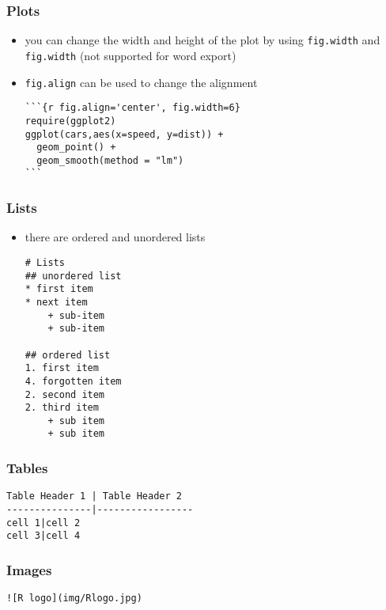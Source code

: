 \begin{frame}[fragile]\frametitle{Plots}
  \begin{itemize}
  \item you can change the width and height of the plot by using \texttt{fig.width} and \texttt{fig.width} (not supported for word export)
  \item \texttt{fig.align} can be used to change the alignment
\begin{verbatim}
```{r fig.align='center', fig.width=6}
require(ggplot2)
ggplot(cars,aes(x=speed, y=dist)) +
  geom_point() +
  geom_smooth(method = "lm")
```
\end{verbatim}
  \end{itemize}
\end{frame}



\begin{frame}[fragile]\frametitle{Lists}
  \begin{itemize}
  \item there are ordered and unordered lists\footnotesize
\begin{verbatim}
# Lists
## unordered list
* first item
* next item
    + sub-item
    + sub-item

## ordered list
1. first item
4. forgotten item
2. second item
2. third item
    + sub item
    + sub item

\end{verbatim}
  \end{itemize}
\end{frame}


\begin{frame}[fragile]\frametitle{Tables}
\footnotesize
\begin{verbatim}
Table Header 1 | Table Header 2
---------------|-----------------
cell 1|cell 2
cell 3|cell 4
\end{verbatim}
\end{frame}


\begin{frame}[fragile]\frametitle{Images}
\footnotesize
\begin{verbatim}
![R logo](img/Rlogo.jpg)
\end{verbatim}
\end{frame}


